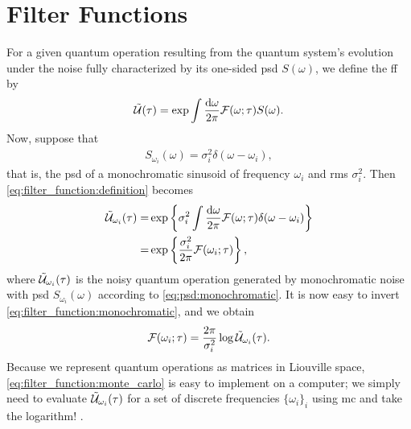 \chapter{Filter Functions}\label{ch:filter_functions}
For a {\color{RWTHmagenta75} given} quantum operation \liouvUe resulting from the quantum system's evolution under the noise fully characterized by its one-sided \gls{psd} $S(\omega)$, we define the \gls{ff} \FF by
\begin{align}
    \label{eq:filter_function:definition}
    \mathcal{\tilde{U}}(\tau) = \exp\int\frac{\dd{\omega}}{2\pi}\mathcal{F}(\omega;\tau) S(\omega).
\end{align}
Now, suppose that
\begin{align}
    \label{eq:psd:monochromatic}
    S_{\omega_i}(\omega) = \sigma_i^2 \delta(\omega - \omega_i), %
\end{align}
that is, the \gls{psd} of a monochromatic sinusoid of frequency $\omega_i$ and \gls{rms} $\sigma_i^2$. %
Then \cref{eq:filter_function:definition} becomes
\begin{equation}
    \label{eq:filter_function:monochromatic}
    \begin{split}
        \mathcal{\tilde{U}}_{\omega_i}(\tau) =& \exp\left\lbrace\sigma_i^2\int\frac{\dd{\omega}}{2\pi}\mathcal{F}(\omega;\tau)\delta(\omega - \omega_i)\right\rbrace \\
                                  =& \exp\left\lbrace\frac{\sigma_i^2}{2\pi}\mathcal{F}(\omega_i;\tau)\right\rbrace,
    \end{split}
\end{equation}
where $\mathcal{\tilde{U}}_{\omega_i}(\tau)$ is the noisy quantum operation generated by monochromatic noise with \gls{psd} $S_{\omega_i}(\omega)$ according to \cref{eq:psd:monochromatic}.
It is now easy to invert \cref{eq:filter_function:monochromatic}, and we obtain
\begin{align}
    \label{eq:filter_function:monte_carlo}
    \mathcal{F}(\omega_i; \tau) = \frac{2\pi}{\sigma_i^2}\log\mathcal{\tilde{U}}_{\omega_i}(\tau).
\end{align}
Because we represent quantum operations as matrices in Liouville space, \cref{eq:filter_function:monte_carlo} is easy to implement on a computer; we simply need to evaluate $\mathcal{\tilde{U}}_{\omega_i}(\tau)$ for a set of discrete frequencies $\lbrace\omega_i\rbrace_i$ using \gls{mc} and take the logarithm! .%

